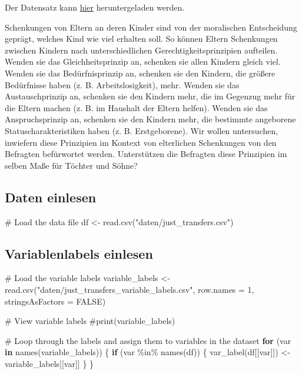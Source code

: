 \documentclass[
  letterpaper,
  DIV=11,
  numbers=noendperiod]{scrartcl}
\newenvironment{Shaded}{\begin{snugshade}}{\end{snugshade}}
\newcommand{\AttributeTok}[1]{\textcolor[rgb]{0.40,0.45,0.13}{#1}}
\newcommand{\CommentTok}[1]{\textcolor[rgb]{0.37,0.37,0.37}{#1}}
\newcommand{\ConstantTok}[1]{\textcolor[rgb]{0.56,0.35,0.01}{#1}}
\newcommand{\ControlFlowTok}[1]{\textcolor[rgb]{0.00,0.23,0.31}{\textbf{#1}}}
\newcommand{\DecValTok}[1]{\textcolor[rgb]{0.68,0.00,0.00}{#1}}
\newcommand{\FunctionTok}[1]{\textcolor[rgb]{0.28,0.35,0.67}{#1}}
\newcommand{\NormalTok}[1]{\textcolor[rgb]{0.00,0.23,0.31}{#1}}
\newcommand{\OtherTok}[1]{\textcolor[rgb]{0.00,0.23,0.31}{#1}}
\newcommand{\SpecialCharTok}[1]{\textcolor[rgb]{0.37,0.37,0.37}{#1}}
\newcommand{\StringTok}[1]{\textcolor[rgb]{0.13,0.47,0.30}{#1}}
\begin{document}
Der Datensatz kann
\href{https://dariatisch.github.io/wup2024/downloads/just_transfers.csv}{hier}
heruntergeladen werden.

Schenkungen von Eltern an deren Kinder sind von der moralischen
Entscheidung geprägt, welches Kind wie viel erhalten soll. So können
Eltern Schenkungen zwischen Kindern nach unterschiedlichen
Gerechtigkeitsprinzipien aufteilen. Wenden sie das Gleichheitsprinzip
an, schenken sie allen Kindern gleich viel. Wenden sie das
Bedürfnisprinzip an, schenken sie den Kindern, die größere Bedürfnisse
haben (z. B. Arbeitslosigkeit), mehr. Wenden sie das Austauschprinzip
an, schenken sie den Kindern mehr, die im Gegenzug mehr für die Eltern
machen (z. B. im Haushalt der Eltern helfen). Wenden sie das
Anspruchsprinzip an, schenken sie den Kindern mehr, die bestimmte
angeborene Statuscharakteristiken haben (z. B. Erstgeborene). Wir wollen
untersuchen, inwiefern diese Prinzipien im Kontext von elterlichen
Schenkungen von den Befragten befürwortet werden. Unterstützen die
Befragten diese Prinzipien im selben Maße für Töchter und Söhne?

\subsection{Daten einlesen}\label{daten-einlesen}

\begin{Shaded}
\begin{Highlighting}[]
\CommentTok{\# Load the data file}
\NormalTok{df }\OtherTok{\textless{}{-}} \FunctionTok{read.csv}\NormalTok{(}\StringTok{"daten/just\_transfers.csv"}\NormalTok{)}
\end{Highlighting}
\end{Shaded}

\subsection{Variablenlabels einlesen}\label{variablenlabels-einlesen}

\begin{Shaded}
\begin{Highlighting}[]
\CommentTok{\# Load the variable labels}
\NormalTok{variable\_labels }\OtherTok{\textless{}{-}} \FunctionTok{read.csv}\NormalTok{(}\StringTok{"daten/just\_transfers\_variable\_labels.csv"}\NormalTok{, }\AttributeTok{row.names =} \DecValTok{1}\NormalTok{, }\AttributeTok{stringsAsFactors =} \ConstantTok{FALSE}\NormalTok{)}

\CommentTok{\# View variable labels}
\CommentTok{\#print(variable\_labels)}


\CommentTok{\# Loop through the labels and assign them to variables in the dataset}
\ControlFlowTok{for}\NormalTok{ (var }\ControlFlowTok{in} \FunctionTok{names}\NormalTok{(variable\_labels)) \{}
  \ControlFlowTok{if}\NormalTok{ (var }\SpecialCharTok{\%in\%} \FunctionTok{names}\NormalTok{(df)) \{}
    \FunctionTok{var\_label}\NormalTok{(df[[var]]) }\OtherTok{\textless{}{-}}\NormalTok{ variable\_labels[[var]]}
\NormalTok{  \}}
\NormalTok{\}}
\end{Highlighting}
\end{Shaded}
\end{document}
